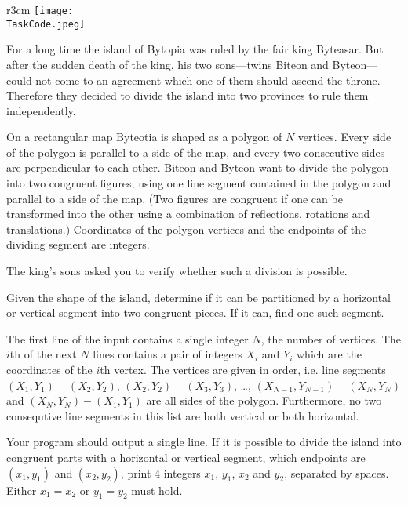 \documentclass{boi2014}
\renewcommand{\TaskCode}{demarcation}
\begin{document}
    \begin{wrapfigure}{r}{3cm}
        \vspace{-24pt}
		\texttt{[image: \\TaskCode.jpeg]}
	\end{wrapfigure}

    For a long time the island of Bytopia was ruled by the fair king
    Byteasar. But after the sudden death
    of the king, his two sons---twins Biteon and Byteon---could
    not come to an agreement which one of them should ascend the throne.
    Therefore they decided to divide the island into two provinces to
    rule them independently.  
 
    On a rectangular map Byteotia is shaped as a polygon of $N$ vertices. Every
    side of the polygon is parallel to a side of the map, and every two
    consecutive sides are perpendicular to each other.  Biteon and Byteon want
    to divide the polygon into two congruent figures, using one line segment
    contained in the polygon and parallel to a side of the map.  (Two figures
    are congruent if one can be transformed into the other using a combination
    of reflections, rotations and translations.) Coordinates of the polygon
    vertices and the endpoints of the dividing segment are integers.  
 
    The king's sons asked you to verify whether such a division is
    possible.

    \Task
    Given the shape of the island, determine if it can be partitioned
    by a horizontal or vertical segment into two congruent pieces. If
    it can, find one such segment.
    
    \Input
    The first line of the input contains a single integer $N$, the number of
    vertices. The $i$th of the next $N$ lines contains a pair of integers $X_i$
    and $Y_i$ which are the coordinates of the $i$th vertex.
    The vertices are given in order, i.e. line segments $(X_1,Y_1) - (X_2,Y_2)$,
    $(X_2,Y_2) - (X_3,Y_3)$, \ldots, $(X_{N-1},Y_{N-1}) - (X_N,Y_N)$ and
    $(X_N,Y_N) - (X_1,Y_1)$ are all sides of the polygon.
    Furthermore, no two consequtive line segments in this list are both vertical
    or both horizontal.

	\Output
	Your program should output a single line. If it is possible to divide the
	island into congruent parts with a horizontal or vertical segment, which
	endpoints are $(x_1, y_1)$ and $(x_2, y_2)$, print 4 integers $x_1$,
	$y_1$, $x_2$ and $y_2$, separated by spaces.
	Either $x_1 = x_2$ or $y_1 = y_2$ must hold.
\end{document}
